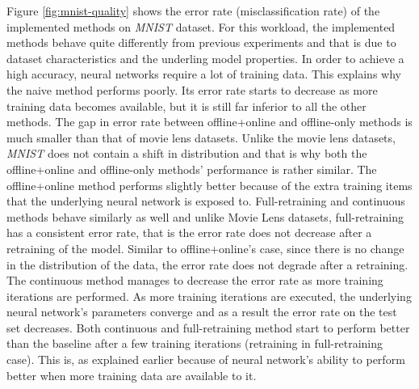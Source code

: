 \documentclass{vldb}
\begin{document}
Figure \ref{fig:mnist-quality} shows the error rate (misclassification rate) of the implemented methods on \textit{MNIST} dataset.
For this workload, the implemented methods behave quite differently from previous experiments and that is due to dataset characteristics and the underling model properties.
In order to achieve a high accuracy, neural networks require a lot of training data.
This explains why the naive method performs poorly.
Its error rate starts to decrease as more training data becomes available, but it is still far inferior to all the other methods.
The gap in error rate between offline+online and offline-only methods is much smaller than that of movie lens datasets.
Unlike the movie lens datasets, \textit{MNIST} does not contain a shift in distribution and that is why both the offline+online and offline-only methods' performance is rather similar.
The offline+online method performs slightly better because of the extra training items that the underlying neural network is exposed to.
Full-retraining and continuous methods behave similarly as well and unlike Movie Lens datasets, full-retraining has a consistent error rate, that is the error rate does not decrease after a retraining of the model.
Similar to offline+online's case, since there is no change in the distribution of the data, the error rate does not degrade after a retraining.
The continuous method manages to decrease the error rate as more training iterations are performed.
As more training iterations are executed, the underlying neural network's parameters converge and as a result the error rate on the test set decreases.
Both continuous and full-retraining method start to perform better than the baseline after a few training iterations (retraining in full-retraining case).
This is, as explained earlier because of neural network's ability to perform better when more training data are available to it.
\end{document}
